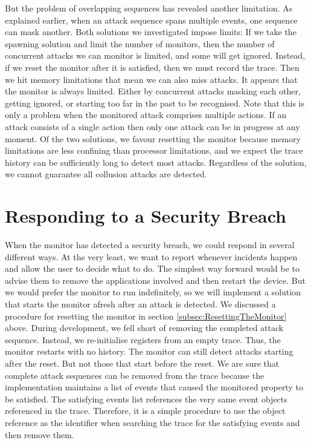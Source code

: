 But the problem of overlapping sequences has revealed another limitation.  As explained earlier, when an attack sequence spans multiple events, one sequence can mask another.  Both solutions we investigated impose limits:  If we take the spawning solution and limit the number of monitors, then the number of concurrent attacks we can monitor is limited, and some will get ignored.  Instead, if we reset the monitor after it is satisfied, then we must record the trace.  Then we hit memory limitations that mean we can also miss attacks.  It appears that the monitor is always limited.  Either by concurrent attacks masking each other, getting ignored, or starting too far in the past to be recognised.  Note that this is only a problem when the monitored attack comprises multiple actions.  If an attack consists of a single action then only one attack can be in progress at any moment.  Of the two solutions, we favour resetting the monitor because memory limitations are less confining than processor limitations, and we expect the trace history can be sufficiently long to detect most attacks.  Regardless of the solution, we cannot guarantee all collusion attacks are detected. 

\section{Responding to a Security Breach}

When the monitor has detected a security breach, we could respond in several different ways.  At the very least, we want to report whenever incidents happen and allow the user to decide what to do.  The simplest way forward would be to advise them to remove the applications involved and then restart the device.  But we would prefer the monitor to run indefinitely, so we will implement a solution that starts the monitor afresh after an attack is detected.  We discussed a procedure for resetting the monitor in section \ref{subsec:ResettingTheMonitor} above.  During development, we fell short of removing the completed attack sequence.  Instead, we re-initialise registers from an empty trace.  Thus, the monitor restarts with no history.  The monitor can still detect attacks starting after the reset.  But not those that start before the reset.  We are sure that complete attack sequences can be removed from the trace because the implementation maintains a list of events that caused the monitored property to be satisfied.  The satisfying events list references the very same event objects referenced in the trace.  Therefore, it is a simple procedure to use the object reference as the identifier when searching the trace for the satisfying events and then remove them.

